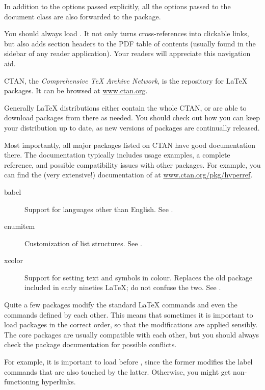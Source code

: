 In addition to the options passed explicitly,
all the options passed to the document class are also forwarded to the package.

\begin{practices}
You should always load .
It not only turns cross-references into clickable links,
but also adds section headers to the PDF table of contents
(usually found in the sidebar of any reader application).
Your readers will appreciate this navigation aid.
\end{practices}

CTAN, the \emph{Comprehensive \TeX{} Archive Network},
is the repository for \LaTeX{} packages.
It can be browsed at \url{www.ctan.org}.

Generally \LaTeX{} distributions either contain the whole CTAN,
or are able to download packages from there as needed.
You should check out how you can keep your distribution up to date,
as new versions of packages are continually released.

Most importantly, all major packages listed on CTAN have good documentation there.
The documentation typically includes usage examples, a complete reference,
and possible compatibility issues with other packages.
For example, you can find the (very extensive!) documentation of 
at \url{www.ctan.org/pkg/hyperref}.

\begin{description}
\item[babel] Support for languages other than English.
    See .
\item[enumitem] Customization of list structures.
    See .
\item[xcolor] Support for setting text and symbols in colour.
    Replaces the old  package included in early nineties \LaTeX{};
    do not confuse the two.
    See .
\end{description}


\begin{gotcha}
Quite a few packages modify the standard \LaTeX{} commands
and even the commands defined by each other.
This means that sometimes it is important to load packages in the correct order,
so that the modifications are applied sensibly.
The core packages are usually compatible with each other,
but you should always check the package documentation for possible conflicts.

For example, it is important to load  before ,
since the former modifies the label commands that are also touched by the latter.
Otherwise, you might get non-functioning hyperlinks.
\end{gotcha}



